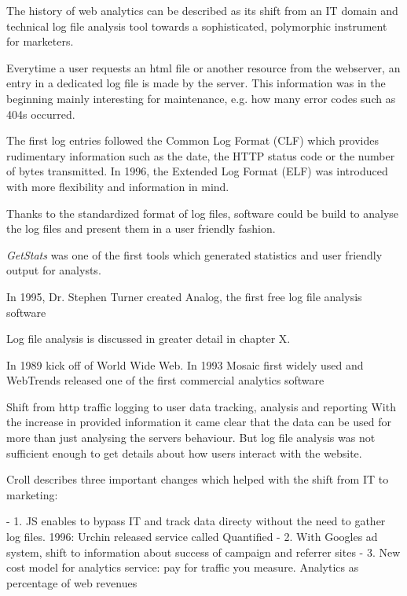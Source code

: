 The history of web analytics can be described as its shift from an IT domain and technical log file analysis tool towards a sophisticated, polymorphic instrument for marketers.


Everytime a user requests an html file or another resource from the webserver, an entry in a dedicated log file is made by the server. %
This information was in the beginning mainly interesting for maintenance, e.g. how many error codes such as 404s occurred.

The first log entries followed the Common Log Format (CLF) which provides rudimentary information such as the date, the HTTP status code or the number of bytes transmitted.
In 1996, the Extended Log Format (ELF) was introduced with more flexibility and information in mind.

Thanks to the standardized format of log files, software could be build to analyse the log files and present them in a user friendly fashion.

\textit{GetStats} was one of the first tools which generated statistics and user friendly output for analysts.

In 1995, Dr. Stephen Turner created Analog, the first free log file analysis software%

Log file analysis is discussed in greater detail in chapter X. %


In 1989 kick off of World Wide Web.
In 1993 Mosaic first widely used and  WebTrends released one of the first commercial analytics software

Shift from http traffic logging to user data tracking, analysis and reporting
With the increase in provided information it came clear that the data can be used for more than just analysing the servers behaviour.
But log file analysis was not sufficient enough to get details about how users interact with the website.


Croll describes three important changes which helped with the shift from IT to marketing:

- 1.  JS enables to bypass IT and track data directy without the need to gather log files. 1996: Urchin released service called Quantified
- 2.  With Googles ad system, shift to information about success of campaign and referrer sites
- 3. New cost model for analytics service: pay for traffic you measure. Analytics as percentage of web revenues



